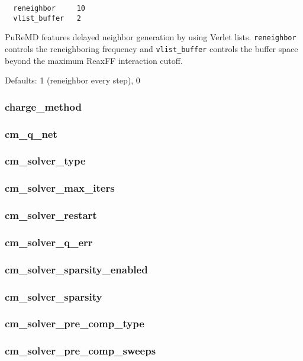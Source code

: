 \documentclass{article}
\begin{document}
\begin{verbatim}
  reneighbor     10
  vlist_buffer   2 
\end{verbatim}
PuReMD features delayed neighbor generation by using Verlet lists. 
{\tt reneighbor} controls the reneighboring frequency and {\tt vlist\_buffer} 
controls the buffer space beyond the maximum ReaxFF interaction cutoff. 

Defaults: 1 (reneighbor every step), 0

\subsubsection{charge\_method}
\label{sec:charge_method}
\subsubsection{cm\_q\_net}
\label{sec:cm_q_net}
\subsubsection{cm\_solver\_type}
\label{sec:cm_solver_type}
\subsubsection{cm\_solver\_max\_iters}
\label{sec:cm_solver_max_iters}
\subsubsection{cm\_solver\_restart}
\label{sec:cm_solver_restart}
\subsubsection{cm\_solver\_q\_err}
\label{sec:cm_solver_q_err}
\subsubsection{cm\_solver\_sparsity\_enabled}
\label{sec:cm_solver_sparsity_enabled}
\subsubsection{cm\_solver\_sparsity}
\label{sec:cm_solver_sparsity}
\subsubsection{cm\_solver\_pre\_comp\_type}
\label{sec:cm_solver_pre_comp_type}
\subsubsection{cm\_solver\_pre\_comp\_sweeps}
\label{sec:cm_solver_pre_comp_sweeps}
\end{document}
